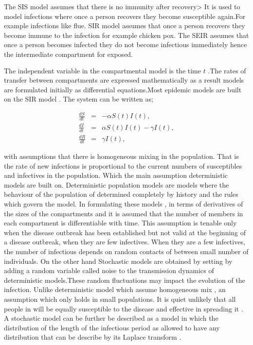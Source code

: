 The SIS model assumes that there is no immunity after recovery> It is used to model infections where once a person recovers they become susceptible again.For example infections like flue. SIR model assumes that once a person recovers they become immune to the infection for example chicken pox. The SEIR assumes that once a person  becomes infected they do not  become infectious immediately hence the intermediate compartment for exposed. 

The independent variable in the compartmental model is the time $t$ .The rates of transfer between compartments are expressed mathematically as a result models are formulated initially as differential equations.Most epidemic models are built on the SIR model  \citep{m1925applications}. The system can be written as;


\begin{center}
\begin{equation} \label{eqn1_1}
\begin{array}{ccl}
\frac{dS}{dt} &= &-\alpha S(t) I(t),\\
 \frac{dI}{dt} &=& \alpha S(t) I(t) - \gamma  I(t), \\
 \frac{dR}{dt} &= &\gamma  I(t),
\end{array}  
\end{equation}
\end{center}


with assumptions that there is homogeneous mixing in the population. That is the rate of new infections is proportional to the current numbers of susceptibles and infectives in the population. Which the main assumption deterministic models are built on. Deterministic population  models are models where the behaviour of the population of determined completely by history and the rules which govern the model. In formulating these models , in terms of derivatives of the sizes of the compartments and it is assumed that the number of members in each compartment is differentiable with time. This assumption is tenable only when the disease outbreak has been established  but not valid at the beginning of a disease outbreak, when they are few infectives. When they are a few infectives, the number of infectious depends on random contacts of between small number of individuals.
 On the other hand Stochastic models are obtained by setting by adding a random variable called noise to the transmission dynamics of deterministic models.These random fluctuations may impact the evolution of the infection. Unlike deterministic model which assume homogeneous mix , an assumption which only holds in small populations. It is quiet unlikely that all people in will be equally susceptible to the disease and effective in spreading it \citep{ball1985deterministic}. A stochastic model can be further be described as a model in which the distribution of the length of the infectious period as allowed to have any distribution that can be describe by its Laplace transform \citep{addy1991generalized}.
 
